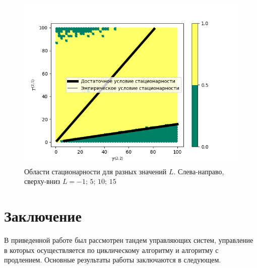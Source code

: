 \documentclass{report}
\begin{document}
\begin{figure}
\begin{multicols}{2}
    \includegraphics[width=1.15\linewidth]{0_1_thres_15_fact.png}\par
\end{multicols}
\caption{Области стационарности для разных значений $L$. Слева-направо, сверху-вниз $L=-1$; $5$; $10$; $15$}
\label{different:thres}
\end{figure}
\newpage
\section{Заключение}
В приведенной работе был рассмотрен тандем управляющих систем, управление в которых осуществляется по циклическому алгоритму и алгоритму с продлением. Основные результаты работы заключаются в следующем.
\end{document}
